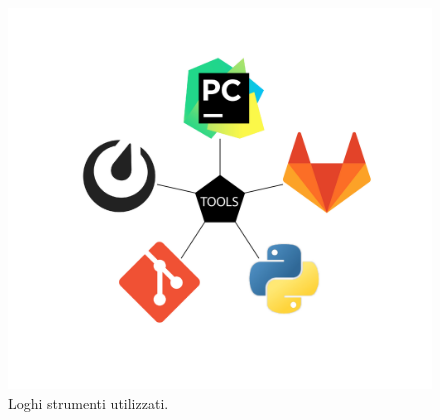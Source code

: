 \begin{figure}[h!]
	\centering
	\includegraphics[scale=0.4]{figures/pentagono_grande-03}
	\caption[Loghi strumenti utilizzati.]{Loghi strumenti utilizzati.
		\label{fig:loghi}}
\end{figure}	